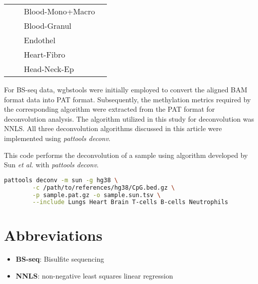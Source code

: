 \documentclass[10pt]{article}
\begin{document}
\begin{table}[htbp]
\begin{center}
\begin{tabular}{|>{\raggedright}m{2cm}|>{\raggedright}m{4cm}|>{\raggedright}m{4cm}|c|}
            \cline{3-4}                             &                                             & Blood-Mono+Macro         &               \\
            \cline{3-4}                             &                                             & Blood-Granul             &               \\
            \cline{2-4}                             & \multirow{2}{*}{Others}                     & Endothel                 &               \\
            \cline{3-4}                             &                                             & Heart-Fibro              &               \\
            \cline{3-4}                             &                                             & Head-Neck-Ep             &               \\
            \hline
        \end{tabular}
    \end{center}
    \label{tab:deconvolution}
\end{table}

For BS-seq data, wgbstools\cite{Loyfer2024.05.08.593132} were initially employed to convert the 
aligned BAM format data into PAT format. Subsequently, the methylation metrics required by the corresponding 
algorithm were extracted from the PAT format for deconvolution analysis. The algorithm utilized in this 
study for deconvolution was NNLS. All three deconvolution algorithms discussed in this article were 
implemented using \textit{pattools deconv}.

This code performs the deconvolution of a sample using algorithm developed by Sun \textit{et al.} with \textit{pattools deconv}.

\begin{lstlisting}[language=sh, caption={}]
pattools deconv -m sun -g hg38 \
        -c /path/to/references/hg38/CpG.bed.gz \
        -p sample.pat.gz -o sample.sun.tsv \
        --include Lungs Heart Brain T-cells B-cells Neutrophils
\end{lstlisting}

\section{Abbreviations}\label{sec:abbr}
\begin{itemize}
    \item  \textbf{BS-seq}: Bisulfite sequencing
    \item  \textbf{NNLS}: non-negative least squares linear regression
\end{itemize}
\end{document}
